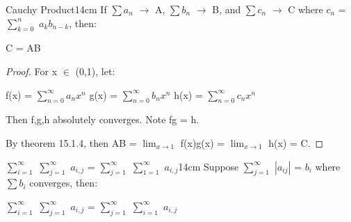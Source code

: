     \newpage

    

    \begin{corollary}{Cauchy Product}{14cm}
        If $\sum a_n$ $\rightarrow$ A, $\sum b_n$ $\rightarrow$ B,
        and $\sum c_n$ $\rightarrow$ C where $c_n$ = $\sum_{k=0}^n$ $a_kb_{n-k}$,
        then:
        
        \hspace{0.5cm}
        C = AB
    \end{corollary}

    \begin{proof}
        For x $\in$ (0,1), let:
        
        \hspace{0.5cm}
        f(x) = $\sum_{n=0}^{\infty} a_n x^n$
        \hspace{1cm}
        g(x) = $\sum_{n=0}^{\infty} b_n x^n$
        \hspace{1cm}
        h(x) = $\sum_{n=0}^{\infty} c_n x^n$

        Then f,g,h absolutely converges.
        Note fg = h.
        
        By {\color{red} theorem 15.1.4}, then
        AB = $\lim_{x \rightarrow 1}$ f(x)g(x) = $\lim_{x \rightarrow 1}$ h(x) = C.
    \end{proof}

    \vspace{0.5cm}



    \begin{wtheorem}{$\sum_{i=1}^{\infty}$ $\sum_{j=1}^{\infty}$ $a_{i,j}$
    = $\sum_{j=1}^{\infty}$ $\sum_{1=1}^{\infty}$ $a_{i,j}$}{14cm}
        Suppose $\sum_{j=1}^{\infty}$ $|a_{ij}|$ = $b_i$ where $\sum b_i$
        converges, then:

        \hspace{0.5cm}
        $\sum_{i=1}^{\infty}$ $\sum_{j=1}^{\infty}$ $a_{i,j}$
        = $\sum_{j=1}^{\infty}$ $\sum_{i=1}^{\infty}$ $a_{i,j}$
    \end{wtheorem}

